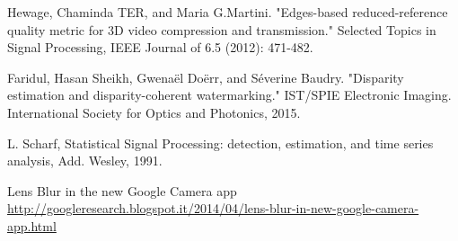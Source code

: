 
\begin{thebibliography}{99}

 Hewage, Chaminda TER, and Maria G.Martini. "Edges-based reduced-reference quality metric for 3D video compression and transmission." Selected Topics in Signal Processing, IEEE Journal of 6.5 (2012): 471-482.

Faridul, Hasan Sheikh, Gwenaël Doërr, and Séverine Baudry. "Disparity estimation and disparity-coherent watermarking." IST/SPIE Electronic Imaging. International Society for Optics and Photonics, 2015.

L. Scharf, Statistical Signal Processing: detection,
estimation, and time series analysis, Add. Wesley,
1991.

 Lens Blur in the new Google Camera app \newline
\url{http://googleresearch.blogspot.it/2014/04/lens-blur-in-new-google-camera-app.html}






\end{thebibliography}
\clearpage
\thispagestyle{empty}